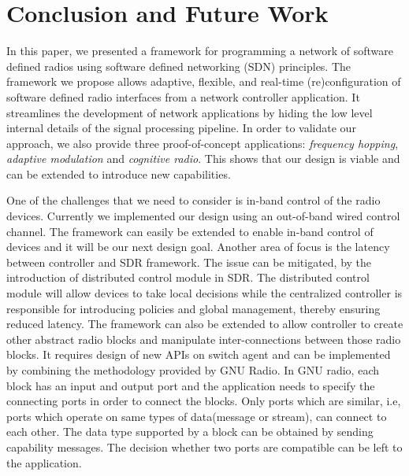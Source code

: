 \section{Conclusion and Future Work}
\label{sec:conclusion}
In this paper, we presented a framework for programming a network of software defined radios using  software defined networking (SDN) principles. The framework we propose allows adaptive, flexible, and real-time (re)configuration of software defined radio interfaces from a network controller application. It streamlines the development of network applications by hiding the low level  internal details of the signal processing pipeline. In order to validate our approach, we also provide three proof-of-concept applications: \emph{frequency hopping}, \emph{adaptive modulation} and \emph{cognitive radio}. This shows that our design is viable and can be extended to introduce new capabilities.

One of the challenges that we need to consider is in-band control of the radio devices. Currently we implemented our design using an out-of-band wired control channel. The \crossflow framework can easily be extended to enable in-band control of devices and it will be our next design goal. Another area of focus is the latency between controller and SDR framework. The issue can be mitigated, by the introduction of distributed control module in SDR. The distributed control module will allow devices to take local decisions while the centralized controller is responsible for introducing policies and global management, thereby ensuring reduced latency.
The \crossflow framework can also be extended to allow controller to create other abstract radio blocks and manipulate inter-connections between those radio blocks. It requires design of new APIs on switch agent and can be implemented by combining the methodology provided by GNU Radio. In GNU radio, each block has an input and output port and the application needs to specify the connecting ports in order to connect the blocks. Only ports which are similar, i.e, ports which operate on same types of data(message or stream), can connect to each other. The data type supported by a block can be obtained by sending capability messages. The decision whether two ports are compatible can be left to the application. 
